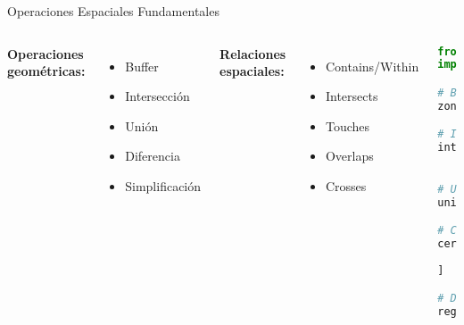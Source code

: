 \documentclass[10pt]{beamer}
\begin{document}
\begin{frame}[fragile]{Operaciones Espaciales Fundamentales}
    \begin{columns}
        \textbf{Operaciones geométricas:}
        \begin{itemize}
            \item Buffer
            \item Intersección
            \item Unión
            \item Diferencia
            \item Simplificación
        \end{itemize}
        
        \textbf{Relaciones espaciales:}
        \begin{itemize}
            \item Contains/Within
            \item Intersects
            \item Touches
            \item Overlaps
            \item Crosses
        \end{itemize}
        
        \begin{lstlisting}[language=Python, caption=Operaciones espaciales]
from shapely.ops import unary_union
import geopandas as gpd

# Buffer
zonas_influencia = gdf.buffer(100)

# Intersección
interseccion = gdf1.overlay(gdf2, 
                           how='intersection')

# Unión de geometrías
union_total = unary_union(gdf.geometry)

# Consultas espaciales
cerca_metro = puntos[
    puntos.distance(estacion) < 500
]

# Dissolve por atributo
regiones = comunas.dissolve(by='REGION')
        \end{lstlisting}
    \end{columns}
\end{frame}
\end{document}
